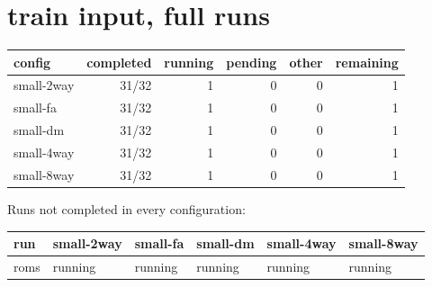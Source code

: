 \documentclass[10pt,a4paper,landscape]{article}
\begin{document}
\section*{train input, full runs}
{\small
\begin{longtable}{lrrrrr}
\toprule
config & completed & running & pending & other & remaining \\
\midrule
\endhead
\bottomrule
\endfoot
small-2way & 31/32 & 1 & 0 & 0 & 1 \\
small-fa & 31/32 & 1 & 0 & 0 & 1 \\
small-dm & 31/32 & 1 & 0 & 0 & 1 \\
small-4way & 31/32 & 1 & 0 & 0 & 1 \\
small-8way & 31/32 & 1 & 0 & 0 & 1 \\
\end{longtable}
}
{\small Runs not completed in every configuration:}\par
\begin{longtable}{llllll}
\toprule
run & small-2way & small-fa & small-dm & small-4way & small-8way \\
\midrule
\endhead
\bottomrule
\endfoot
roms & running & running & running & running & running \\
\end{longtable}
\end{document}
